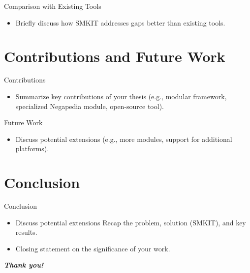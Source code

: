 \documentclass{beamer}
\begin{document}
    \begin{frame}{Comparison with Existing Tools}
        \begin{itemize}
            \item Briefly discuss how SMKIT addresses gaps better than existing tools.
        \end{itemize}
    \end{frame}


\section{Contributions and Future Work}
    \begin{frame}{Contributions}
        \begin{itemize}
            \item Summarize key contributions of your thesis (e.g., modular framework, specialized Negapedia module, open-source tool).
        \end{itemize}
    \end{frame}

    \begin{frame}{Future Work}
        \begin{itemize}
            \item Discuss potential extensions (e.g., more modules, support for additional platforms).
        \end{itemize}
    \end{frame}


\section{Conclusion}
    \begin{frame}{Conclusion}
        \begin{itemize}
            \item Discuss potential extensions Recap the problem, solution (SMKIT), and key results.
            \item Closing statement on the significance of your work.
        \end{itemize}
    \end{frame}


\begin{emptyframe}
     \textbf{ \textit{Thank you!} }
\end{emptyframe}

\appendix
    
\end{document}
